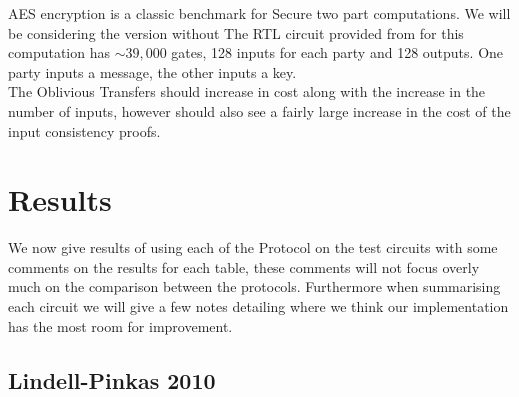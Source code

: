 \documentclass[ %
                    author={Nicholas Tutte},
                supervisor={Prof. Nigel Smart},
                    degree={MEng},
                     title={Secure Two Party Computation},
                  subtitle={A practical comparison of recent protocols},
                      type={Research - GG1K},
                      year={2015} ]{dissertation}
\begin{document}
				AES encryption is a classic benchmark for Secure two part computations. We will be considering the version without The RTL circuit provided from \cite{NigelCircuits} for this computation has $\sim 39,000$ gates, 128 inputs for each party and 128 outputs. One party inputs a message, the other inputs a key.\\

				The Oblivious Transfers should increase in cost along with the increase in the number of inputs, however should also see a fairly large increase in the cost of the input consistency proofs.

		\section{Results}
			We now give results of using each of the Protocol on the test circuits with some comments on the results for each table, these comments will not focus overly much on the comparison between the protocols. Furthermore when summarising each circuit we will give a few notes detailing where we think our implementation has the most room for improvement.

			\FloatBarrier
			\subsection{Lindell-Pinkas 2010}
\end{document}
